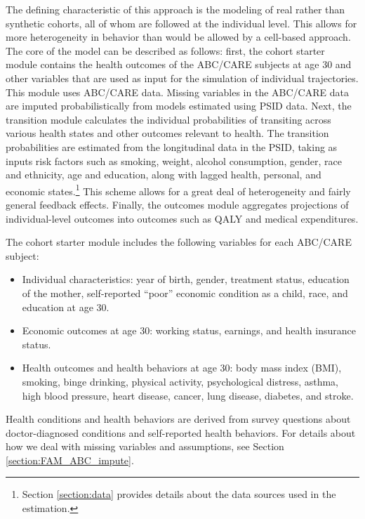 \noindent The defining characteristic of this approach is the modeling of real rather than synthetic cohorts, all of whom
are followed at the individual level. This allows for more heterogeneity in behavior than would be allowed
by a cell-based approach. The core of the model can be described as follows: first, the cohort starter module contains the health outcomes of the ABC/CARE subjects at age 30 and other variables that are used as input for the simulation of individual trajectories. This module uses ABC/CARE data. Missing variables in the ABC/CARE data are imputed probabilistically from models estimated using PSID data. Next, the transition module calculates the individual probabilities of transiting across various health states and other outcomes relevant to health. The transition probabilities are estimated from the longitudinal data in the PSID, taking as inputs risk factors such as smoking, weight, alcohol consumption, gender, race and ethnicity, age and education, along with lagged health, personal, and economic states.\footnote{Section \ref{section:data} provides details about the data sources used in the estimation.} This scheme allows for a great deal of heterogeneity and fairly general feedback effects. Finally, the outcomes module aggregates projections of individual-level outcomes into outcomes such as
QALY and medical expenditures. 


\noindent The cohort starter module includes the following variables for each ABC/CARE subject: 
\begin{itemize}
\item Individual characteristics: year of birth, gender, treatment status, education of the mother, self-reported ``poor'' economic condition as a child, race, and education at age 30.
\item Economic outcomes at age 30: working status, earnings, and health insurance status.
\item Health outcomes and health behaviors at age 30: body mass index (BMI), smoking, binge drinking, physical activity, psychological distress, asthma, high blood pressure, heart disease, cancer, lung disease, diabetes, and stroke.
\end{itemize}
\noindent Health conditions and health behaviors are derived from survey questions about doctor-diagnosed conditions and self-reported health behaviors. For details about how we deal with missing variables and assumptions, see Section \ref{section:FAM_ABC_impute}. %
 

